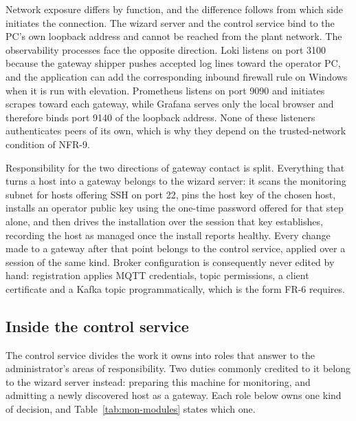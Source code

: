 \documentclass[12pt,a4paper]{report}
\begin{document}
Network exposure differs by function, and the difference follows
from which side initiates the connection. The wizard server and
the control service bind to the PC's own loopback address and cannot
be reached from the plant network. The observability processes face
the opposite direction. Loki listens on port 3100 because the
gateway shipper pushes accepted log lines toward the operator PC,
and the application can add the corresponding inbound firewall
rule on Windows when it is run with elevation. Prometheus listens
on port 9090 and initiates scrapes toward each gateway, while
Grafana serves only the local browser and therefore binds port 9140
of the loopback address. None of these listeners authenticates
peers of its own, which is why they depend on the trusted-network
condition of NFR-9.

Responsibility for the two directions of gateway contact is split.
Everything that turns a host into a gateway belongs to the wizard
server: it scans the monitoring subnet for hosts offering SSH on port
22, pins the host key of the chosen host, installs an operator public
key using the one-time password offered for that step alone, and then
drives the installation over the session that key establishes,
recording the host as managed once the install reports healthy. Every
change made to a gateway after that point belongs to the control
service, applied over a session of the same kind. Broker configuration
is consequently never edited by hand: registration applies MQTT
credentials, topic permissions, a client certificate and a Kafka
topic programmatically, which is the form FR-6 requires.

\subsection{Inside the control service}
\label{sec:mon-modules}

The control service divides the work it owns into roles that answer
to the administrator's areas of responsibility. Two duties commonly
credited to it belong to the wizard server instead: preparing this
machine for monitoring, and admitting a newly discovered host as a
gateway. Each role below owns one kind of decision, and
Table~\ref{tab:mon-modules} states which one.
\end{document}
